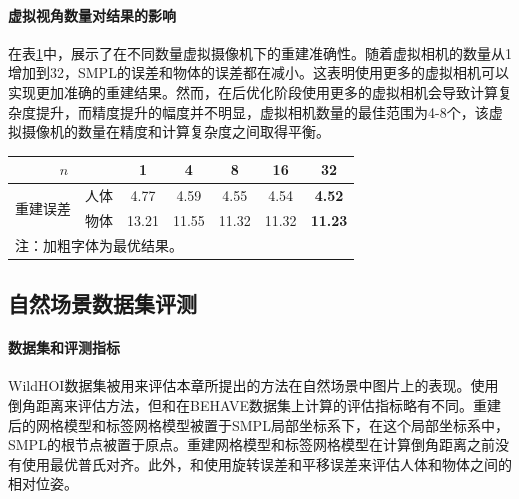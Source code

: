 \paragraph{虚拟视角数量对结果的影响} 
在表\ref{tab:ablation_viewports_num}中，展示了在不同数量虚拟摄像机下的重建准确性。随着虚拟相机的数量从1增加到32，SMPL的误差和物体的误差都在减小。这表明使用更多的虚拟相机可以实现更加准确的重建结果。然而，在后优化阶段使用更多的虚拟相机会导致计算复杂度提升，而精度提升的幅度并不明显，虚拟相机数量的最佳范围为4-8个，该虚拟摄像机的数量在精度和计算复杂度之间取得平衡。

\begin{table}[!htbp]
	\label{tab:ablation_viewports_num}
	\centering
	\footnotesize
	\setlength{\tabcolsep}{4pt}
	\renewcommand{\arraystretch}{1.2}
	\begin{tabular}{ccccccc}
		\toprule
		\multicolumn{2}{c}{$n$} & 1 & 4 & 8 & 16 & 32 \\
		\hline
		\multirow{2}{*}{重建误差}  & 人体 & 4.77 & 4.59 & 4.55 & 4.54 & \textbf{4.52} \\
		\cline{2-7}
		& 物体 & 13.21 & 11.55 & 11.32 & 11.32 & \textbf{11.23} \\
		\bottomrule
		\multicolumn{7}{l}{注：加粗字体为最优结果。}
	\end{tabular}
\end{table}

\subsection{自然场景数据集评测}

\paragraph{数据集和评测指标} 
WildHOI数据集被用来评估本章所提出的方法在自然场景中图片上的表现。使用倒角距离来评估方法，但和在BEHAVE数据集上计算的评估指标略有不同。重建后的网格模型和标签网格模型被置于SMPL局部坐标系下，在这个局部坐标系中，SMPL的根节点被置于原点。重建网格模型和标签网格模型在计算倒角距离之前没有使用最优普氏对齐。此外，和使用旋转误差和平移误差来评估人体和物体之间的相对位姿。%

